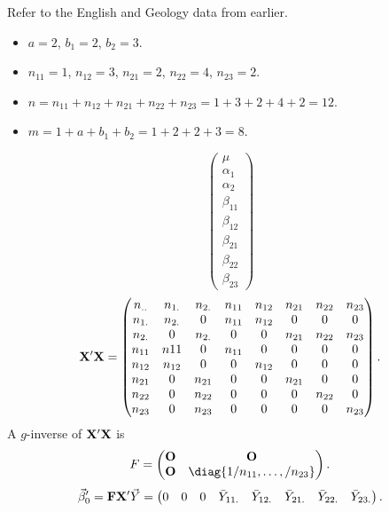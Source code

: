\begin{Example}{}{}
    Refer to the English and Geology data from earlier.
    \begin{itemize}
        \item $ a=2 $, $ b_1=2 $, $ b_2=3 $.
        \item $ n_{11}=1 $, $ n_{12}=3 $, $ n_{21}=2 $, $ n_{22}=4 $, $ n_{23}=2 $.
        \item $ n=n_{11}+n_{12}+n_{21}+n_{22}+n_{23}=1+3+2+4+2=12 $.
        \item $ m=1+a+b_1+b_2=1+2+2+3=8 $.
    \end{itemize}
    \[ \begin{pmatrix}
            \mu        \\
            \alpha_1   \\
            \alpha_2   \\
            \beta_{11} \\
            \beta_{12} \\
            \beta_{21} \\
            \beta_{22} \\
            \beta_{23}
        \end{pmatrix} \]
    \[ \mathbf{X}'\mathbf{X}=\begin{pmatrix}
            n_{..} & n_{1.} & n_{2.} & n_{11} & n_{12} & n_{21} & n_{22} & n_{23} \\
            n_{1.} & n_{2.} & 0      & n_{11} & n_{12} & 0      & 0      & 0      \\
            n_{2.} & 0      & n_{2.} & 0      & 0      & n_{21} & n_{22} & n_{23} \\
            n_{11} & n{11}  & 0      & n_{11} & 0      & 0      & 0      & 0      \\
            n_{12} & n_{12} & 0      & 0      & n_{12} & 0      & 0      & 0      \\
            n_{21} & 0      & n_{21} & 0      & 0      & n_{21} & 0      & 0      \\
            n_{22} & 0      & n_{22} & 0      & 0      & 0      & n_{22} & 0      \\
            n_{23} & 0      & n_{23} & 0      & 0      & 0      & 0      & n_{23}
        \end{pmatrix}. \]
    A $ g $-inverse of $ \mathbf{X}'\mathbf{X} $ is
    \[ F=\begin{pmatrix}
            \Matrix{O} & \Matrix{O}                     \\
            \Matrix{O} & \diag{1/n_{11},\ldots,/n_{23}}
        \end{pmatrix}. \]
    \[ \vec{\beta}_0'=\mathbf{F}\mathbf{X}'\vec{Y}=\begin{pmatrix}
            0 & 0 & 0 & \bar{Y}_{11.} & \bar{Y}_{12.} & \bar{Y}_{21.} & \bar{Y}_{22.} & \bar{Y}_{23.}
        \end{pmatrix}. \]
\end{Example}